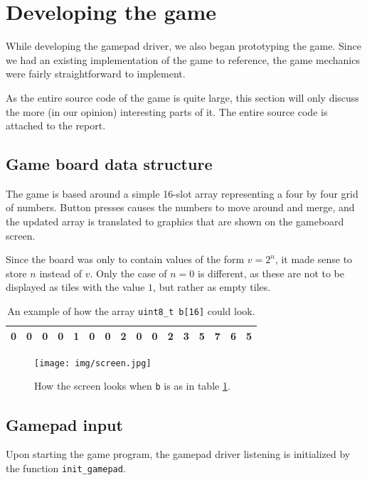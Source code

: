 \newpage
\section{Developing the game}
While developing the gamepad driver, we also began prototyping the game.
Since we had an existing implementation of the game \cite{2048} to reference,
the game mechanics were fairly straightforward to implement.

As the entire source code of the game is quite large, this section will only discuss the more (in our opinion) interesting parts of it.
The entire source code is attached to the report.

\subsection{Game board data structure\label{data_structure}}
The game is based around a simple 16-slot array representing a four by four grid of numbers.
Button presses causes the numbers to move around and merge,
and the updated array is translated to graphics that are shown on the gameboard screen.

Since the board was only to contain values of the form $v = 2^n$, it made sense to store $n$ instead of $v$. Only the case of $n = 0$ is different, as these are not to be displayed as tiles with the value $1$, but rather as empty tiles.

\begin{table}[h!]
    \centering
    \begin{tabular}{|l|l|l|l|l|l|l|l|l|l|l|l|l|l|l|l|}
        \hline
        0 & 0 & 0 & 0 &
        1 & 0 & 0 & 2 &
        0 & 0 & 2 & 3 &
        5 & 7 & 6 & 5 \\ \hline
    \end{tabular}
    \caption{An example of how the array \texttt{uint8\_t b[16]} could look.}
    \label{array_b}
\end{table}

\begin{figure}[h!]
    \centering
    \texttt{[image: img/screen.jpg]}
    \caption{How the screen looks when \texttt{b} is as in table \ref{array_b}.}
\end{figure}

\newpage
\subsection{Gamepad input}
\label{gamepad-input}
Upon starting the game program, the gamepad driver listening is initialized by the function \texttt{init\_gamepad}.

